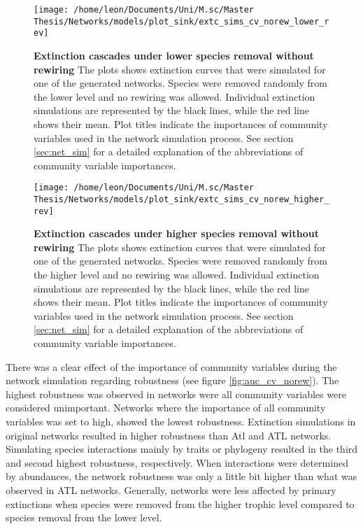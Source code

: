 \documentclass[12pt,a4paper]{article}
\begin{document}
\begin{figure}[H]
	 \centering
	 \texttt{[image: /home/leon/Documents/Uni/M.sc/Master Thesis/Networks/models/plot\_sink/extc\_sims\_cv\_norew\_lower\_rev]}
	 \captionsetup{width = \textwidth}
	 \caption[Extinction cascades under lower species removal without rewiring]{\textbf{Extinction cascades under lower species removal without rewiring} The plots shows extinction curves that were simulated for one of the generated networks. Species were removed randomly from the lower level and no rewiring was allowed. Individual extinction simulations are represented by the black lines, while the red line shows their mean. Plot titles indicate the importances of community variables used in the network simulation process. See section \ref{sec:net_sim} for a detailed explanation of the abbreviations of community variable importances.}
	 \label{fig:extc_cv_norew_lower}
\end{figure}


\begin{figure}[H]
	 \centering
	 \texttt{[image: /home/leon/Documents/Uni/M.sc/Master Thesis/Networks/models/plot\_sink/extc\_sims\_cv\_norew\_higher\_rev]}
	 \captionsetup{width = \textwidth}
	 \caption[Extinction cascades under higher species removal without rewiring]{\textbf{Extinction cascades under higher species removal without rewiring} The plots shows extinction curves that were simulated for one of the generated networks. Species were removed randomly from the higher level and no rewiring was allowed. Individual extinction simulations are represented by the black lines, while the red line shows their mean. Plot titles indicate the importances of community variables used in the network simulation process. See section \ref{sec:net_sim} for a detailed explanation of the abbreviations of community variable importances.}
	 \label{fig:extc_cv_norew_higher}
\end{figure}

There was a clear effect of the importance of community variables during the network simulation regarding robustness (see figure \ref{fig:auc_cv_norew}). The highest robustness was observed in networks were all community variables were considered unimportant. Networks where the importance of all community variables was set to high, showed the lowest robustness. Extinction simulations in original networks resulted in higher robustness than Atl and ATL networks. Simulating species interactions mainly by traits or phylogeny resulted in the third and second highest robustness, respectively. When interactions were determined by abundances, the network robustness was only a little bit higher than what was observed in ATL networks. Generally, networks were less affected by primary extinctions when species were removed from the higher trophic level compared to species removal from the lower level. \par
\end{document}
